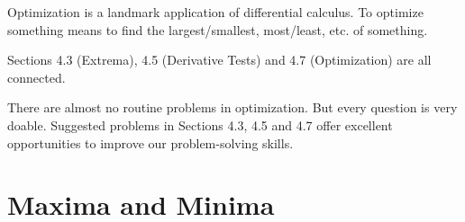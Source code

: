 \documentclass[../main.tex]{subfiles}
\begin{document}
 Optimization is a landmark application of differential calculus.  
To optimize something means to find the largest/smallest, most/least, etc. of something. 

Sections 4.3 (Extrema), 4.5 (Derivative Tests) and 4.7 (Optimization) are all connected.

\faExclamationTriangle{} There are almost no routine problems in optimization. But every question is very doable. Suggested problems in Sections 4.3, 4.5 and 4.7 offer excellent opportunities to improve our problem-solving skills.

\section{Maxima and Minima}
\end{document}
